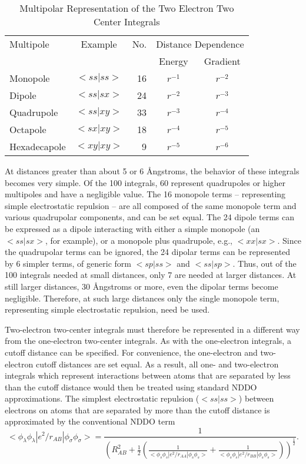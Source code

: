 \begin{table}
\caption{\label{multipoles} Multipolar Representation of the Two Electron Two Center Integrals}
\begin{center}
\begin{tabular}{lcrcc} \hline
Multipole    & Example & No. & \multicolumn{2}{c}{Distance Dependence} \\
             &         &     & Energy & Gradient \\ \hline
Monopole     & $<\!ss|ss\!>$& 16  & $r^{-1}$& $r^{-2}$\\
Dipole       & $<\!ss|sx\!>$ & 24  & $r^{-2}$& $r^{-3}$\\
Quadrupole   & $<\!ss|xy\!>$ & 33  & $r^{-3}$& $r^{-4}$\\
Octapole     & $<\!sx|xy\!>$ & 18  & $r^{-4}$& $r^{-5}$\\
Hexadecapole & $<\!xy|xy\!>$ &  9  & $r^{-5}$& $r^{-6}$\\
\hline
\end{tabular}
\end{center}
\end{table}

At distances greater than about 5 or 6 \AA ngstroms, the behavior of these
integrals becomes very simple.  Of the 100 integrals, 60 represent quadrupoles 
or higher multipoles and have a negligible value.  The 16 monopole terms --
representing simple electrostatic repulsion -- are all composed of the same
monopole term and various quadrupolar components, and can be set equal. The 24
dipole terms can be expressed as a dipole interacting with either a simple
monopole (an $<\! ss|sx\!>$, for example), or a monopole plus quadrupole,
e.g.,   $<\! xx|sx\!>$. Since the quadrupolar terms can be ignored, the 24
dipolar terms can be represented by 6 simpler terms, of generic form  $<\!
sp|ss\!>$  and  $<\! ss|sp\!>$.  Thus, out of the 100 integrals needed at small
distances, only 7 are needed at larger distances. At still larger distances, 30
\AA ngstroms or more, even the dipolar terms become negligible.  Therefore, at
such large distances only the single monopole term, representing simple
electrostatic repulsion, need be used.

Two-electron two-center integrals must therefore be represented in a different
way from the one-electron two-center integrals.  As with the one-electron
integrals, a cutoff distance can be specified.  For convenience, the
one-electron and two-electron cutoff distances are set equal. As a result, all
one- and two-electron  integrals which represent interactions between atoms
that are separated by less than the cutoff distance would then be treated using
standard NDDO approximations. The simplest electrostatic repulsion 
($<\!ss|ss\!>$) between electrons on atoms  that are separated by more than the
cutoff distance is approximated by the conventional NDDO term 
\begin{equation}
<\!\phi_{\lambda}\phi_{\lambda}|e^2/r_{AB}|\phi_{\sigma}\phi_{\sigma}\!> =
\frac{1}{\left (R_{AB}^2+\frac{1}{2}(
\frac{1}
{<\!\phi_{s}\phi_{s}|e^2/r_{AA}|\phi_{s}\phi_{s}\!>} +
\frac{1}{<\!\phi_{s}\phi_{s}|e^2/r_{BB}|\phi_{s}\phi_{s}\!>})
\right )^{\frac{1}{2}}}.
\end{equation}

